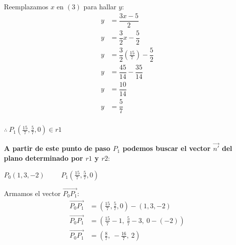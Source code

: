 \begin{multicols}{2}
	Reemplazamos $x$ en $(3)$ para hallar $y$:
	\begin{align*}
		y & = \dfrac{3x - 5}{2}                                      \\
		y & = \dfrac{3}{2}x - \dfrac{5}{2}                           \\
		y & = \dfrac{3}{2} \left(\frac{15}{7} \right) - \dfrac{5}{2} \\
		y & = \dfrac{45}{14} - \dfrac{35}{14}                        \\
		y & = \dfrac{10}{14}                                         \\
		y & = \boxed{\dfrac{5}{7}}                                   \\
	\end{align*}

	$\therefore \ \boxed{P_1 \left (\frac{15}{7}, \frac{5}{7}, 0 \right) \in r1}$
\end{multicols}

\vspace{6cm}
\noindent \textbf{A partir de este punto de paso $P_1$ podemos buscar el vector $\vec{n'}$ del plano determinado por $r1$ y $r2$}:

\begin{center}
	$P_0(1, 3, -2) \hspace{1cm} P_1 \left (\frac{15}{7}, \frac{5}{7}, 0 \right)$
\end{center}

\noindent Armamos el vector $\overrightarrow{P_0P_1}$:
\begin{align*}
	\overrightarrow{P_0P_1} & = \left (\frac{15}{7}, \frac{5}{7}, 0 \right) - (1, 3, -2)       \\
	\overrightarrow{P_0P_1} & = \left (\frac{15}{7} - 1, \ \frac{5}{7} - 3, \ 0 - (-2) \right) \\
	\overrightarrow{P_0P_1} & = \left (\frac{8}{7}, \ -\frac{16}{7}, \ 2 \right)               \\
\end{align*}

